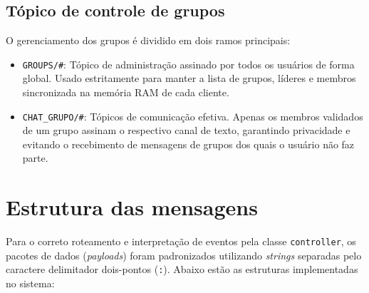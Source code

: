 \documentclass{report}
\begin{document}
\subsection{Tópico de controle de grupos}
O gerenciamento dos grupos é dividido em dois ramos principais:
\begin{itemize}
    \item \texttt{GROUPS/\#}: Tópico de administração assinado por todos os usuários de forma global. Usado estritamente para manter a lista de grupos, líderes e membros sincronizada na memória RAM de cada cliente.
    \item \texttt{CHAT\_GRUPO/\#}: Tópicos de comunicação efetiva. Apenas os membros validados de um grupo assinam o respectivo canal de texto, garantindo privacidade e evitando o recebimento de mensagens de grupos dos quais o usuário não faz parte.
\end{itemize}

\section{Estrutura das mensagens}
Para o correto roteamento e interpretação de eventos pela classe \texttt{controller}, os pacotes de dados (\textit{payloads}) foram padronizados utilizando \textit{strings} separadas pelo caractere delimitador dois-pontos (\texttt{:}). Abaixo estão as estruturas implementadas no sistema:
\end{document}
